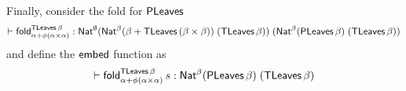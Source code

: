 \documentclass[acmsmall,review,anonymous]{acmart}
\theoremstyle{definition}
\begin{document}
Finally, consider the fold for $\mathsf{PLeaves}$
\[
	\vdash \mathsf{fold}_{\alpha + \phi(\alpha \times \alpha)}^{\mathsf{TLeaves}\,\beta}
	: \mathsf{Nat}^{\emptyset}
	(\mathsf{Nat}^{\beta} (\beta + \mathsf{TLeaves}\,(\beta \times \beta)) \; (\mathsf{TLeaves}\,\beta))\;
	(\mathsf{Nat}^{\beta} (\mathsf{PLeaves}\,\beta) \; (\mathsf{TLeaves}\,\beta))
\]
and define the $\mathsf{embed}$ function as
\[
	\vdash \mathsf{fold}_{\alpha + \phi(\alpha \times \alpha)}^{\mathsf{TLeaves}\, \beta}\, s
	: \mathsf{Nat}^{\beta} (\mathsf{PLeaves}\,\beta) \; (\mathsf{TLeaves}\,\beta)
\]
\end{document}
